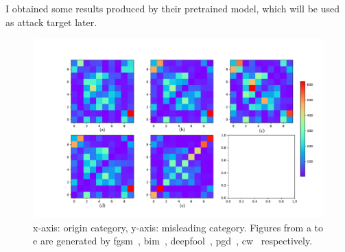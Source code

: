 \documentclass[10pt]{beamer}
\begin{document}
\begin{frame}
  I obtained some results produced by their pretrained model, which will be
  used as attack target later.
  \begin{figure}
  \end{figure}
\end{frame}
\begin{frame}
  \begin{figure}
    \includegraphics[width=1\linewidth]{figure/20210917/hotmap_attack_matrix.pdf}
    \caption{x-axis: origin category, y-axis: misleading category. Figures from a to e are
    generated by fgsm~\cite{fgsm}, bim~\cite{ifgsm}, 
    deepfool~\cite{deepfool}, pgd~\cite{pgd}, cw~\cite{cw} respectively.}
  \end{figure}
\end{frame}
\end{document}
